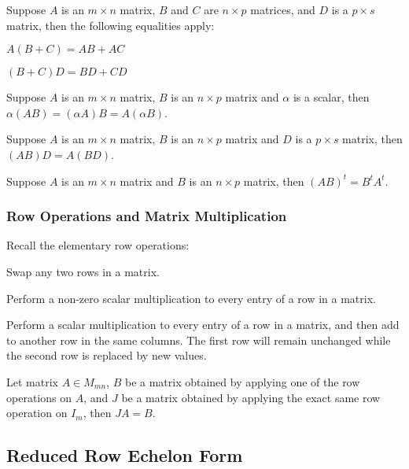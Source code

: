\documentclass[a4paper,12pt]{article}
\begin{document}
\begin{pst}
  Suppose $A$ is an $m\times n$ matrix, $B$ and $C$ are $n\times p$ matrices, and $D$ is a $p\times s$ matrix, then the following equalities apply:
  \begin{alist}
    \item $A(B+C)=AB+AC$
    \item $(B+C)D=BD+CD$
  \end{alist}
\end{pst}\n

\begin{pst}
  Suppose $A$ is an $m\times n$ matrix, $B$ is an $n\times p$ matrix and $\alpha$ is a scalar, then $\alpha(AB)=(\alpha A)B=A(\alpha B)$.
\end{pst}\n

\begin{pst}
  Suppose $A$ is an $m\times n$ matrix, $B$ is an $n\times p$ matrix and $D$ is a $p\times s$ matrix, then $(AB)D=A(BD)$.
\end{pst}\n

\begin{pst}
  Suppose $A$ is an $m\times n$ matrix and $B$ is an $n\times p$ matrix, then $(AB)^{t}=B^{t}A^{t}$.
\end{pst}

\subsubsection{Row Operations and Matrix Multiplication}
Recall the elementary row operations:

\begin{alist}
  \item Swap any two rows in a matrix.
  \item Perform a non-zero scalar multiplication to every entry of a row in a matrix.
  \item Perform a scalar multiplication to every entry of a row in a matrix, and then add to another row in the same columns. The first row will remain unchanged while the second row is replaced by new values.
\end{alist}

\begin{pst}
  Let matrix $A\in M_{mn}$, $B$ be a matrix obtained by applying one of the row operations on $A$, and $J$ be a matrix obtained by applying the exact same row operation on $I_{m}$, then $JA=B$.
\end{pst}

\subsection{Reduced Row Echelon Form}
\end{document}
